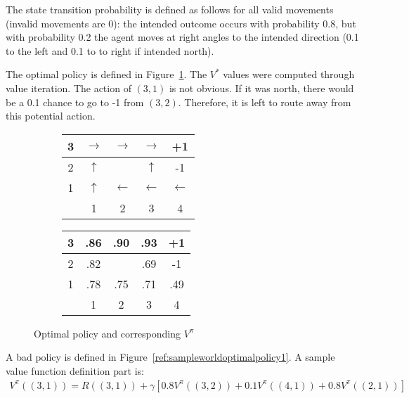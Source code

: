 \documentclass{report}
\begin{document}
The state transition probability is defined as follows for all valid movements (invalid movements are 0): the intended outcome occurs with probability 0.8, but with probability 0.2 the agent moves at right angles to the intended direction (0.1 to the left and 0.1 to to right if intended north).

The optimal policy is defined in Figure~\ref{ref:sampleworldoptimalpolicy}.
The $V^{*}$ values were computed through value iteration.
The action of $(3, 1)$ is not obvious. If it was north, there would be a 0.1 chance to go to -1 from $(3, 2)$.
Therefore, it is left to route away from this potential action.

\begin{figure}[h!]
\centering
\begin{subfigure}[b]{0.4\textwidth}
\begin{tabular}{c|c|c|c|c|}
\hline
3 & $\rightarrow$ & $\rightarrow$ & $\rightarrow$ & +1 \\
\hline
2 & $\uparrow$ & \cellcolor{black} & $\uparrow$ & -1 \\
\hline
1 & $\uparrow$ & $\leftarrow$ & $\leftarrow$ & $\leftarrow$ \\
\hline
& 1 & 2 & 3 & 4 \\
\end{tabular}
\end{subfigure}
\begin{subfigure}[b]{0.4\textwidth}
\begin{tabular}{c|c|c|c|c|}
\hline
3 & .86 & .90 & .93 & +1 \\
\hline
2 & .82 &\cellcolor{black} & .69 & -1 \\
\hline
1 & .78 & .75 & .71 & .49 \\
\hline
& 1 & 2 & 3 & 4 \\
\end{tabular}
\end{subfigure}
\caption{Optimal policy and corresponding $V^{\pi}$}
\label{ref:sampleworldoptimalpolicy}
\end{figure}

A bad policy is defined in Figure~\ref{ref:sampleworldoptimalpolicy1}. A sample value function definition part is:
\begin{align*}
V^{\pi}((3,1))=R((3,1)) + \gamma[0.8V^{\pi}((3,2))+0.1V^{\pi}((4,1))+0.8V^{\pi}((2,1))]
\end{align*}
\end{document}
